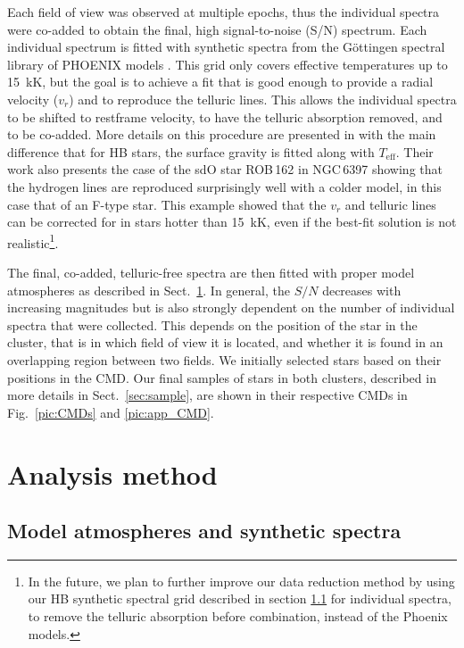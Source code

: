 \documentclass{aa}
\newcommand{\teff}{$T_{\text{eff}}$}
\begin{document}
Each field of view was observed at multiple epochs, thus the individual spectra were co-added to obtain the final, high signal-to-noise (S/N) spectrum. Each individual spectrum is fitted with synthetic spectra from the G\"{o}ttingen spectral library of PHOENIX models \citep{husser2013}. This grid only covers effective temperatures up to 15~kK, but the goal is to achieve a fit that is good enough to provide a radial velocity ($v_r$) and to reproduce the telluric lines. This allows the individual spectra to be shifted to restframe velocity, to have the telluric absorption removed, and to be co-added. More details on this procedure are presented in \citet{husser2016} with the main difference that for HB stars, the surface gravity is fitted along with \teff. 
Their work also presents the case of the sdO star ROB\,162 in NGC\,6397 \citep{1986A&A...169..244H} showing that the hydrogen lines are reproduced surprisingly well with a colder model, in this case that of an F-type star. This example showed that the $v_r$ and telluric lines can be corrected for in stars hotter than 15~kK, even if the best-fit solution is not realistic\footnote{In the future, we plan to further improve our data reduction method by using our HB synthetic spectral grid described in section \ref{subsec:model_spec} for individual spectra, to remove the telluric absorption before combination, instead of the Phoenix models.}. 

The final, co-added, telluric-free spectra are then fitted with proper model atmospheres as described in Sect.~\ref{sec:method}. In general, the $S/N$ decreases with increasing magnitudes but is also strongly dependent on the number of individual spectra that were collected. This depends on the position of the star in the cluster, that is in which field of view it is located, and whether it is found in an overlapping region between two fields.
We initially selected stars based on their positions in the CMD.
Our final samples of stars in both clusters, described in more details in Sect.~\ref{sec:sample}, are shown in their respective CMDs in Fig.~\ref{pic:CMDs} and \ref{pic:app_CMD}.


   
\section{Analysis method}\label{sec:method}
\subsection{Model atmospheres and synthetic spectra}\label{subsec:model_spec}
\end{document}
